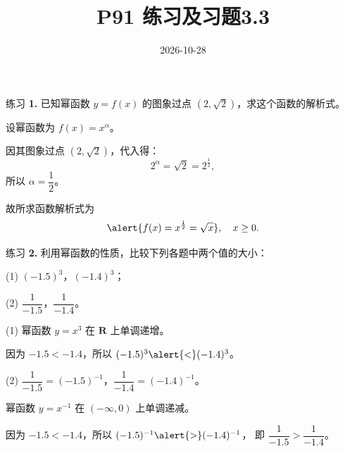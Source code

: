 \documentclass[10pt,aspectratio=169,serif,fleqn]{beamer}
\title[习题3.3]{P91 练习及习题3.3 }
\subtitle{}
\author{}
\institute{}
\date{2026-10-28}
\begin{document}
\begin{frame}
  \titlepage
\end{frame}

\begin{frame}[t]{练习 \textbf{1.} 已知幂函数 $y=f(x)$ 的图象过点 $(2,\sqrt{2})$，求这个函数的解析式。}
	
	\vspace{-2em}
		\begin{tcolorbox}[colback=orange!10,colframe=orange,title=\textbf{解}]
		设幂函数为 $f(x)=x^{\alpha}$。
		
		\vspace{0.3em}
		因其图象过点 $(2,\sqrt{2})$，代入得：
		\[
		2^{\alpha}=\sqrt{2}=2^{\frac12},
		\]
		所以 $\alpha=\dfrac12$。
		
		\vspace{0.5em}
		故所求函数解析式为
		\[
		\alert{f(x)=x^{\frac12}=\sqrt{x}},\quad x\ge 0.
		\]
	\end{tcolorbox}
\end{frame}



\begin{frame}[t]{练习 \textbf{2.} 利用幂函数的性质，比较下列各题中两个值的大小：}
	
	
	\vspace{-1em}
	(1) $(-1.5)^3$，$(-1.4)^3$；
	
	\vspace{0.5em}
	(2) $\dfrac{1}{-1.5}$，$\dfrac{1}{-1.4}$。
	
	
		\begin{tcolorbox}[colback=orange!10,colframe=orange,title=\textbf{解}]
		(1) 幂函数 $y=x^3$ 在 $\mathbf{R}$ 上单调递增。
		
		\vspace{0.3em}
		因为 $-1.5<-1.4$，所以 $(-1.5)^3\alert{<}(-1.4)^3$。
		
		\vspace{0.8em}
		(2) $\dfrac{1}{-1.5}=(-1.5)^{-1}$，$\dfrac{1}{-1.4}=(-1.4)^{-1}$。
		
		\vspace{0.3em}
		幂函数 $y=x^{-1}$ 在 $(-\infty,0)$ 上单调递减。
		
		\vspace{0.3em}
		因为 $-1.5<-1.4$，所以 $(-1.5)^{-1}\alert{>}(-1.4)^{-1}$，
		即 $\dfrac{1}{-1.5}>\dfrac{1}{-1.4}$。
	\end{tcolorbox}
\end{frame}
\end{document}
